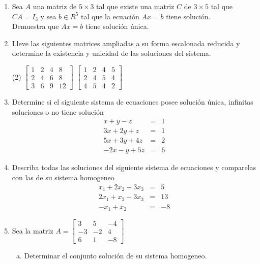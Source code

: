 \documentclass[12pt]{article}
\newenvironment{preguntas}
{\begin{enumerate}\itemsep12pt
	}
	{
	\end{enumerate}
}
\begin{document}
\begin{preguntas}
$$\begin{array}{rcr}
	x_2-4x_3+x_4& = & 0\\
	-x_1+6x_2+x_3+5x_4& = & 3\\
	-x_2+5x_3+4x_4 & = & 0
	\end{array}
	$$
\item Sea $A$ una matriz de $5 \times 3$ tal que existe una matriz $C$ de $3 \times 5$ tal que $CA = I_3$ y sea $b \in R^5$ tal que la ecuación $Ax = b$ tiene solución.\\
Demuestra que $Ax = b$ tiene solución única.
\item Lleve las siguientes matrices ampliadas a su forma escalonada reducida y determine la existencia y unicidad de las soluciones del sistema.
\begin{tasks}(2)
\task $
		\begin{bmatrix}
		1 & 2 & 4 & 8\\
		2 & 4 & 6 & 8\\
		3 & 6 & 9 & 12
		\end{bmatrix}
		$
\task $
		\begin{bmatrix}
		1 & 2 & 4 & 5\\
		2 & 4 & 5& 4\\
		4 & 5 & 4 & 2
		\end{bmatrix}
		$
\end{tasks}
\item Determine si el siguiente sistema de ecuaciones posee solución única, infinitas soluciones o no tiene solución
	$$
	\begin{array}{rcr}
	x+y-z& = & 1\\
	3x+2y+z& = & 1\\
	5x+3y+4z& = & 2\\
	-2x -y +5z & = & 6
	\end{array}$$
\item Describa todas las soluciones del siguiente sistema de ecuaciones y comparelas con las de su sistema homogeneo
	$$
	\begin{array}{rcr}
	x_1 +2x_2-3x_3& = & 5\\
	2x_1 + x_2 - 3x_3& = & 13\\
	-x_1 + x_2 & = & -8
	\end{array}$$
\item Sea la matriz $A=
	\begin{bmatrix}
	3 & 5 & -4\\
	-3 & -2 & 4\\
	6 & 1 & -8
	\end{bmatrix}$
\begin{enumerate}[a)]
\item Determinar el conjunto solución de su sistema homogeneo.

\end{enumerate}
\end{preguntas}
\end{document}

